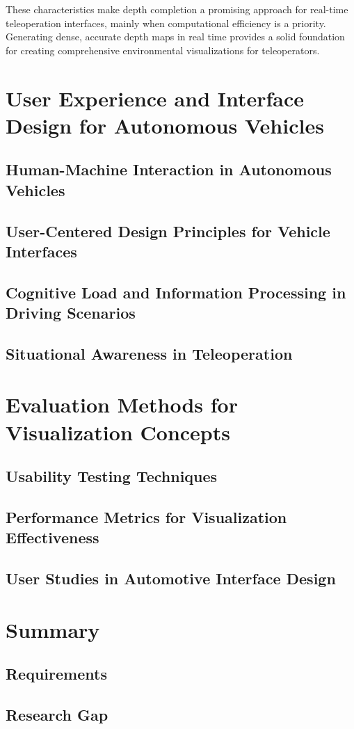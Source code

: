 These characteristics make depth completion a promising approach for real-time teleoperation interfaces, mainly when computational efficiency is a priority. Generating dense, accurate depth maps in real time provides a solid foundation for creating comprehensive environmental visualizations for teleoperators.

\section{User Experience and Interface Design for Autonomous Vehicles}
\subsection{Human-Machine Interaction in Autonomous Vehicles}
\subsection{User-Centered Design Principles for Vehicle Interfaces}
\subsection{Cognitive Load and Information Processing in Driving Scenarios}
\subsection{Situational Awareness in Teleoperation}

\section{Evaluation Methods for Visualization Concepts}
\subsection{Usability Testing Techniques}
\subsection{Performance Metrics for Visualization Effectiveness}
\subsection{User Studies in Automotive Interface Design}

\section{Summary}
\subsection{Requirements}
\subsection{Research Gap}


